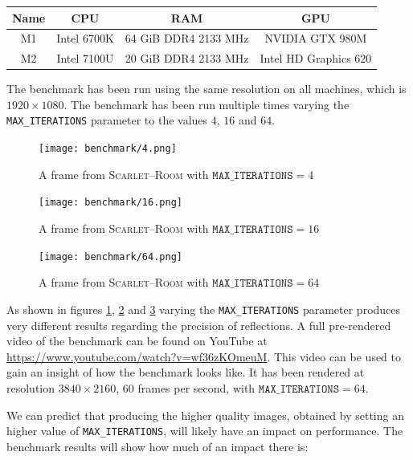 \documentclass[11pt,a4paper]{report}
\begin{document}
\begin{center}
	\begin{tabular}{ | c | c | c | c | } \hline
		Name & CPU & RAM & GPU \\ \hline
		M1 & Intel 6700K & 64 GiB DDR4 2133 MHz & NVIDIA GTX 980M \\
		M2 & Intel 7100U & 20 GiB DDR4 2133 MHz & Intel HD Graphics 620 \\
		\hline \end{tabular}
\end{center}

The benchmark has been run using the same resolution on all machines, which is $1920 \times 1080$. The benchmark has been run multiple times varying the \texttt{MAX\_ITERATIONS} parameter to the values $4$, $16$ and $64$.

\begin{figure}[htp]
	\centering
	\texttt{[image: benchmark/4.png]}
	\caption{A frame from \textsc{Scarlet--Room} with $\texttt{MAX\_ITERATIONS} = 4$}
	\label{eval:4}
\end{figure}

\begin{figure}[htp]
	\centering
	\texttt{[image: benchmark/16.png]}
	\caption{A frame from \textsc{Scarlet--Room} with $\texttt{MAX\_ITERATIONS} = 16$}
	\label{eval:16}
\end{figure}

\begin{figure}[htp]
	\centering
	\texttt{[image: benchmark/64.png]}
	\caption{A frame from \textsc{Scarlet--Room} with $\texttt{MAX\_ITERATIONS} = 64$}
	\label{eval:64}
\end{figure}

As shown in figures \ref{eval:4}, \ref{eval:16} and \ref{eval:64} varying the \texttt{MAX\_ITERATIONS} parameter produces very different results regarding the precision of reflections. A full pre-rendered video of the benchmark can be found on YouTube at \url{https://www.youtube.com/watch?v=wf36zKOmeuM}. This video can be used to gain an insight of how the benchmark looks like. It has been rendered at resolution $3840 \times 2160$, 60 frames per second, with $\texttt{MAX\_ITERATIONS} = 64$.

We can predict that producing the higher quality images, obtained by setting an higher value of \texttt{MAX\_ITERATIONS}, will likely have an impact on performance. The benchmark results will show how much of an impact there is:
\end{document}
